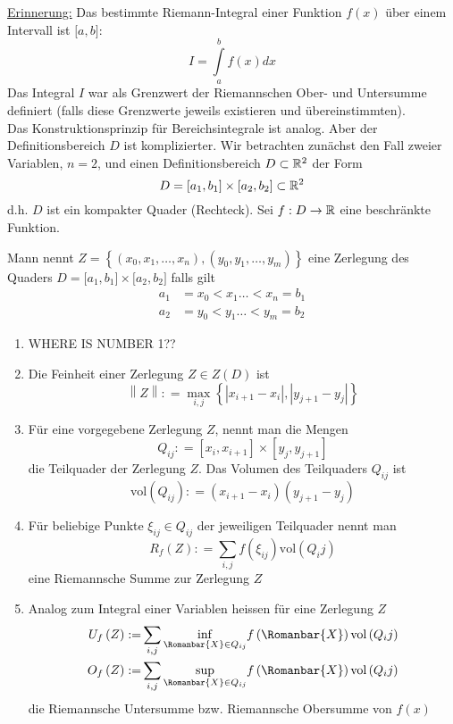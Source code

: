 \underline{Erinnerung:} Das bestimmte Riemann-Integral einer Funktion $f(x)$ über einem Intervall ist $\lbrack a,b\rbrack:$
\[I=\int\limits_a^b f(x)dx\] Das Integral $I$ war als Grenzwert der Riemannschen Ober- und Untersumme definiert (falls diese Grenzwerte jeweils existieren und übereinstimmten).\\

Das Konstruktionsprinzip für Bereichsintegrale ist analog. Aber der Definitionsbereich $D$ ist komplizierter. Wir betrachten zunächst den Fall zweier Variablen, $n=2$, und einen Definitionsbereich $D\subset\mathbb{R}^2$ der Form
\[D=\lbrack a_1,b_1\rbrack\times\lbrack a_2,b_2\rbrack\subset\mathbb{R}^2\]
d.h. $D$ ist ein kompakter Quader (Rechteck). Sei $f:D\to\mathbb{R}$ eine beschränkte Funktion.

\begin{definition}{9.1}
Mann nennt $Z=\left\{ \left( x_0,x_1,\dots,x_n\right), \left( y_0,y_1,\dots,y_m\right)\right\}$ eine Zerlegung des Quaders $D=\lbrack a_1,b_1\rbrack\times\lbrack a_2,b_2\rbrack$ falls gilt
\begin{align*}
a_1&=x_0 < x_1\dots <x_n=b_1\\
a_2&=y_0 < y_1\dots <y_m=b_2
\end{align*}
\begin{enumerate}
\item WHERE IS NUMBER 1??
\item Die Feinheit einer Zerlegung $Z\in Z\left( D\right)$ ist \[\left\| Z \right\|: = \mathop {\max }\limits_{i,j} \left\{ {\left| {{x_{i + 1}} - {x_i}} \right|,\left| {{y_{j + 1}} - {y_j}} \right|} \right\}\]
\item Für eine vorgegebene Zerlegung $Z$, nennt man die Mengen \[{Q_{ij}}: = \left[ {{x_i},{x_{i + 1}}} \right] \times \left[ {{y_j},{y_{j + 1}}} \right]\] die Teilquader der Zerlegung $Z$. Das Volumen des Teilquaders $Q_{ij}$ ist \[\text{vol}\left( {{Q_{ij}}} \right): = \left( {{x_{i + 1}} - {x_i}} \right)\left( {{y_{j + 1}} - {y_j}} \right)\]
\item Für beliebige Punkte $\xi_{ij}\in Q_{ij}$ der jeweiligen Teilquader nennt man \[{R_f}\left( Z \right): = \sum\limits_{i,j} {f\left( {{\xi _{ij}}} \right){\text{vol}}\left( {{Q_i}j} \right)} \] eine Riemannsche Summe zur Zerlegung $Z$
\item Analog zum Integral einer Variablen heissen für eine Zerlegung $Z$
\begin{align*}
{U_f}\left( Z \right): =&\sum\limits_{i,j} {\mathop {\inf }\limits_{\Romanbar{X}\in Q_{ij}} } f\left(\Romanbar{X}\right){\text{vol}}\left( {{Q_i}j} \right)\\
{O_f}\left( Z \right): =&\sum\limits_{i,j} {\mathop {\sup }\limits_{\Romanbar{X}\in Q_{ij}} } f\left(\Romanbar{X}\right){\text{vol}}\left( {{Q_i}j} \right)
\end{align*}
die Riemannsche Untersumme bzw. Riemannsche Obersumme von $f\left( x\right)$
\end{enumerate}
\end{definition}
